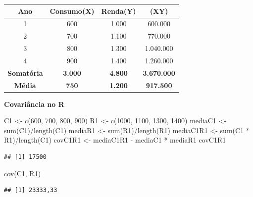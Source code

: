 \documentclass[
]{book}
\newenvironment{Shaded}{\begin{snugshade}}{\end{snugshade}}
\newcommand{\DecValTok}[1]{\textcolor[rgb]{0.00,0.00,0.81}{#1}}
\newcommand{\FunctionTok}[1]{\textcolor[rgb]{0.00,0.00,0.00}{#1}}
\newcommand{\NormalTok}[1]{#1}
\newcommand{\OtherTok}[1]{\textcolor[rgb]{0.56,0.35,0.01}{#1}}
\newcommand{\SpecialCharTok}[1]{\textcolor[rgb]{0.00,0.00,0.00}{#1}}
\begin{document}
\begin{longtable}[]{@{}cccc@{}}
\toprule
Ano & Consumo(X) & Renda(Y) & (XY) \\
\midrule
\endhead
1 & 600 & 1.000 & 600.000 \\
2 & 700 & 1.100 & 770.000 \\
3 & 800 & 1.300 & 1.040.000 \\
4 & 900 & 1.400 & 1.260.000 \\
\textbf{Somatória} & \textbf{3.000} & \textbf{4.800} & \textbf{3.670.000} \\
\textbf{Média} & \textbf{750} & \textbf{1.200} & \textbf{917.500} \\
\bottomrule
\end{longtable}

\textbf{Covariância no R}

\begin{Shaded}
\begin{Highlighting}[]
\NormalTok{C1 }\OtherTok{\textless{}{-}} \FunctionTok{c}\NormalTok{(}\DecValTok{600}\NormalTok{, }\DecValTok{700}\NormalTok{, }\DecValTok{800}\NormalTok{, }\DecValTok{900}\NormalTok{)}
\NormalTok{R1 }\OtherTok{\textless{}{-}} \FunctionTok{c}\NormalTok{(}\DecValTok{1000}\NormalTok{, }\DecValTok{1100}\NormalTok{, }\DecValTok{1300}\NormalTok{, }\DecValTok{1400}\NormalTok{)}
\NormalTok{mediaC1 }\OtherTok{\textless{}{-}} \FunctionTok{sum}\NormalTok{(C1)}\SpecialCharTok{/}\FunctionTok{length}\NormalTok{(C1)}
\NormalTok{mediaR1 }\OtherTok{\textless{}{-}} \FunctionTok{sum}\NormalTok{(R1)}\SpecialCharTok{/}\FunctionTok{length}\NormalTok{(R1)}
\NormalTok{mediaC1R1 }\OtherTok{\textless{}{-}} \FunctionTok{sum}\NormalTok{(C1 }\SpecialCharTok{*}\NormalTok{ R1)}\SpecialCharTok{/}\FunctionTok{length}\NormalTok{(C1)}
\NormalTok{covC1R1 }\OtherTok{\textless{}{-}}\NormalTok{ mediaC1R1 }\SpecialCharTok{{-}}\NormalTok{ mediaC1 }\SpecialCharTok{*}\NormalTok{ mediaR1}
\NormalTok{covC1R1}
\end{Highlighting}
\end{Shaded}

\begin{verbatim}
## [1] 17500
\end{verbatim}

\begin{Shaded}
\begin{Highlighting}[]
\FunctionTok{cov}\NormalTok{(C1, R1)}
\end{Highlighting}
\end{Shaded}

\begin{verbatim}
## [1] 23333,33
\end{verbatim}
\end{document}
